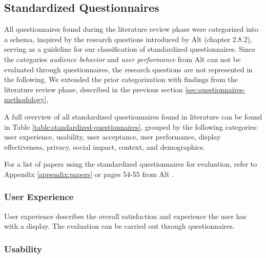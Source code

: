 




\subsection{Standardized Questionnaires}



	All questionnaires found during the literature review phase were categorized into a schema, inspired by the research questions introduced by Alt \cite{alt2013thesis} (chapter 2.8.2), serving as a guideline for our classification of standardized questionnaires. Since the categories \textit{audience behavior} and \textit{user performance} from Alt can not be evaluated through questionnaires, the research questions are not represented in the following.
	We extended the prior categorization with findings from the literature review phase, described in the previous section \ref{sec:questionnaires-methodology}, 

	A full overview of all standardized questionnaires found in literature can be found in Table \ref{table:standardized-questionnaires}, grouped by the following categories: user experience, usability, user acceptance, user performance, display effectiveness, privacy, social impact, context, and demographics.

	For a list of papers using the standardized questionnaires for evaluation, refer to Appendix \ref{appendix:papers} or pages 54-55 from Alt \cite{alt2013thesis}.



	\subsubsection{User Experience}

		User experience describes the overall satisfaction and experience the user has with a display. The evaluation can be carried out through questionnaires.
	
	\subsubsection{Usability}

